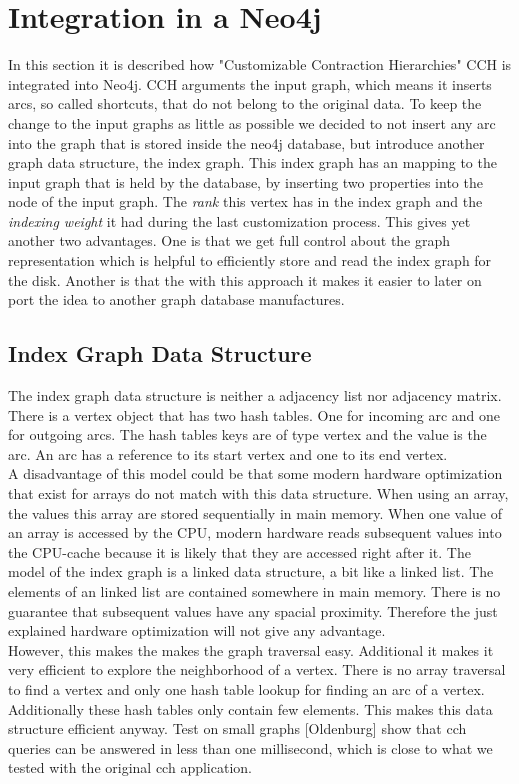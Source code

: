 \chapter{Integration in a Neo4j}

In this section it is described how "Customizable Contraction Hierarchies" CCH is integrated into Neo4j. CCH arguments the input graph, which means it inserts arcs, so called shortcuts, that do not belong to the original data. To keep the change to the input graphs as little as possible we decided to not insert any arc into the graph that is stored inside the neo4j database, but introduce another graph data structure, the index graph. This index graph has an mapping to the input graph that is held by the database, by inserting two properties into the node of the input graph. The \textit{rank} this vertex has in the index graph and the \textit{indexing weight} it had during the last customization process. This gives yet another two advantages. One is that we get full control about the graph representation which is helpful to efficiently store and read the index graph for the disk. Another is that the with this approach it makes it easier to later on port the idea to another graph database manufactures.

\section{Index Graph Data Structure}\label{sec:index_graph}

The index graph data structure is neither a adjacency list nor adjacency matrix. There is a vertex object that has two hash tables. One for incoming arc and one for outgoing arcs. The hash tables keys are of type vertex and the value is the arc. An arc has a reference to its start vertex and one to its end vertex. \\
A disadvantage of this model could be that some modern hardware optimization that exist for arrays do not match with this data structure. When using an array, the values this array are stored sequentially in main memory. When one value of an array is accessed by the CPU, modern hardware reads subsequent values into the CPU-cache because it is likely that they are accessed right after it. The model of the index graph is a linked data structure, a bit like a linked list. The elements of an linked list are contained somewhere in main memory. There is no guarantee that subsequent values have any spacial proximity. Therefore the just explained hardware optimization will not give any advantage. \\ %
However, this makes the makes the graph traversal easy. Additional it makes it very efficient to explore the neighborhood of a vertex. There is no array traversal to find a vertex and only one hash table lookup for finding an arc of a vertex. Additionally these hash tables only contain few elements. This makes this data structure efficient anyway. Test on small graphs [Oldenburg] show that cch queries can be answered in less than one millisecond, which is close to what we tested with the original cch application.

